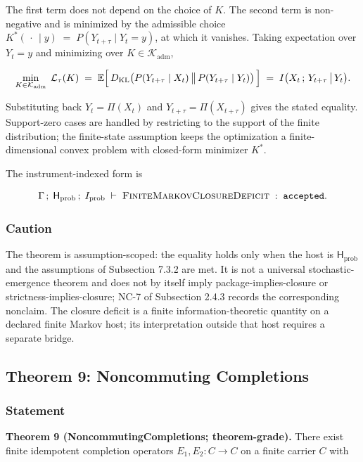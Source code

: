 \documentclass[11pt]{article}
\theoremstyle{definition}
\begin{document}
The first term does not depend on the choice of \(K\). The second term is non-negative and is minimized by the admissible choice \(K^\ast(\,\cdot\,\mid y)\;=\;P(Y_{t+\tau}\mid Y_t=y)\), at which it vanishes. Taking expectation over \(Y_t=y\) and minimizing over \(K\in\mathcal K_{\mathrm{adm}}\),

\[
\min_{K\in\mathcal K_{\mathrm{adm}}}\;\mathcal L_\tau(K)\;=\;\mathbb E\Bigl[\,D_{\mathrm{KL}}\bigl(P(Y_{t+\tau}\mid X_t)\,\big\|\,P(Y_{t+\tau}\mid Y_t)\bigr)\,\Bigr]\;=\;I\bigl(X_t\,;\,Y_{t+\tau}\,\big|\,Y_t\bigr).
\]

Substituting back \(Y_t=\Pi(X_t)\) and \(Y_{t+\tau}=\Pi(X_{t+\tau})\) gives the stated equality. Support-zero cases are handled by restricting to the support of the finite distribution; the finite-state assumption keeps the optimization a finite-dimensional convex problem with closed-form minimizer \(K^\ast\).

The instrument-indexed form is

\[
\Gamma\,;\;\mathsf H_{\mathrm{prob}}\,;\;I_{\mathrm{prob}}\;\vdash\;\textsc{FiniteMarkovClosureDeficit}\;:\;\texttt{accepted}.
\]

\subsubsection{Caution}

The theorem is assumption-scoped: the equality holds only when the host is \(\mathsf H_{\mathrm{prob}}\) and the assumptions of Subsection 7.3.2 are met. It is not a universal stochastic-emergence theorem and does not by itself imply package-implies-closure or strictness-implies-closure; NC-7 of Subsection 2.4.3 records the corresponding nonclaim. The closure deficit is a finite information-theoretic quantity on a declared finite Markov host; its interpretation outside that host requires a separate bridge.

\subsection{Theorem 9: Noncommuting Completions}

\subsubsection{Statement}

\textbf{Theorem 9 (NoncommutingCompletions; theorem-grade).} There exist finite idempotent completion operators \(E_1,E_2:C\to C\) on a finite carrier \(C\) with
\end{document}
